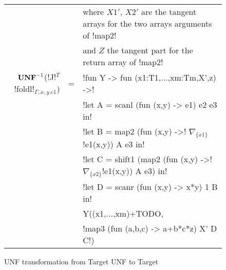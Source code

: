 \begin{figure*}[t]
\begin{tabular}{r c l}
    && where $X1'$, $X2'$ are the tangent arrays for the two arrays arguments of !map2! \\
    && and $Z$ the tangent part for the return array of !map2! \\
    $\mathbf{UNF}^{-1}$(!J!$^T$!foldl!$_{\Gamma,x,y.e1}$) &=&  !fun Y -> fun (x1:T1,...,xm:Tm,X',z) ->!\\
    && !let A = scanl (fun (x,y) -> e1) e2 e3 in! \\
    && !let B = map2 (fun (x,y) ->! $\nabla_{\{x1\}}$!e1(x,y)) A e3 in!\\
    && !let C = shift1 (map2 (fun (x,y) ->! $\nabla_{\{x2\}}$!e1(x,y)) A e3) in!\\
    && !let D = scanr (fun (x,y) -> x*y) 1 B in!\\
    && Y((x1,...,xm)+TODO, \\
    && !map3 (fun (a,b,c) -> a+b*c*z) X' D C!)
    \end{tabular}
    \caption{UNF transformation from Target UNF to Target}
    \label{fig:unf_to_target}
    \end{figure*}